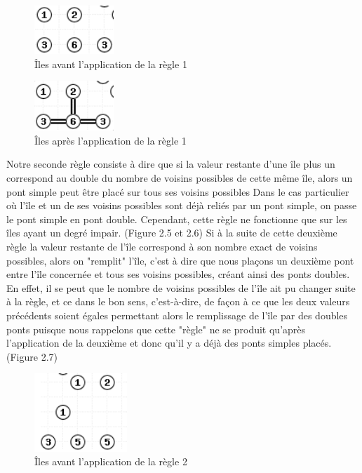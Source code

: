 \begin{figure}[htp]
  \centering
  \includegraphics[width=3cm]{images/Regle1}
  \caption{Îles avant l'application de la règle 1}
\end{figure}

\begin{figure}[htp]
  \centering
  \includegraphics[width=3cm]{images/Regle1_2}
  \caption{Îles après l'application de la règle 1}
\end{figure}


Notre seconde règle consiste à dire que si la valeur restante d'une île plus un correspond au double du nombre de voisins possibles de cette même île, alors un pont simple peut être placé sur tous ses voisins possibles Dans le cas particulier où l'île et un de ses voisins possibles sont déjà reliés par un pont simple, on passe le pont simple en pont double. Cependant, cette règle ne fonctionne que sur les îles ayant un degré impair. (Figure 2.5 et 2.6)
\newline
Si à la suite de cette deuxième règle la valeur restante de l'île correspond à son nombre exact de voisins possibles, alors on "remplit" l'île, c'est à dire que nous plaçons un deuxième pont entre l'île concernée et tous ses voisins possibles, créant ainsi des ponts doubles. En effet, il se peut que le nombre de voisins possibles de l'île ait pu changer suite à la règle, et ce dans le bon sens, c'est-à-dire, de façon à ce que les deux valeurs précédents soient égales permettant alors le remplissage de l'île par des doubles ponts puisque nous rappelons que cette "règle" ne se produit qu'après l'application de la deuxième et donc qu'il y a déjà des ponts simples placés. (Figure 2.7) \newline

\begin{figure}[htp]
  \centering
  \includegraphics[width=3.5cm]{images/Regle2_1}
  \caption{Îles avant l'application de la règle 2}
\end{figure}

